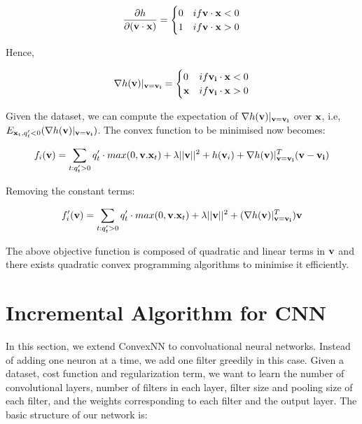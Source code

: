 \documentclass{article}
\begin{document}
\begin{align}
\frac{\partial h}{\partial {\bf (v\cdot x)}} = 
\begin{cases}
0 & if {\bf v\cdot x} < 0 \\
1 & if {\bf v\cdot x} > 0 \\
\end{cases} 
\end{align}

Hence, 

\begin{align}
\nabla h({\bf v})|_{\bf v = v_i} =
\begin{cases}
0 & if {\bf v_i \cdot x} < 0 \\
{\bf x} & if {\bf v_i \cdot x} > 0 \\
\end{cases} 
\end{align}

Given the dataset, we can compute the expectation of $\nabla h({\bf v})|_{\bf v = v_i}$ over ${\bf x}$, i.e, $E_{{\bf x}_t, q'_t < 0}(\nabla h({\bf v})|_{\bf v = v_i})$. The convex function to be minimised now becomes:

\begin{align}
f_i({\bf v}) = \sum_{t: q'_t > 0} q'_t \cdot max(0, {\bf v}.{\bf x}_t) + \lambda ||{\bf v}||^2 + h({\bf v}_i) + \nabla h({\bf v})|_{\bf v = v_i}^T ({\bf v} - {\bf v_i})
\end{align}

Removing the constant terms:

\begin{align}
f'_i({\bf v}) = \sum_{t: q'_t > 0} q'_t \cdot max(0, {\bf v}.{\bf x}_t) + \lambda ||{\bf v}||^2 + (\nabla h({\bf v})|_{\bf v = v_i}^T) {\bf v}
\end{align}

The above objective function is composed of quadratic and linear terms in ${\bf v}$ and there exists quadratic convex programming algorithms to minimise it efficiently.

\section{Incremental Algorithm for CNN}

In this section, we extend ConvexNN to convoluational neural networks. Instead of adding one neuron at a time, we add one filter greedily in this case. Given a dataset, cost function and regularization term, we want to learn the number of convolutional layers, number of filters in each layer, filter size and pooling size of each filter, and the weights corresponding to each filter and the output layer. The basic structure of our network is:
\end{document}
